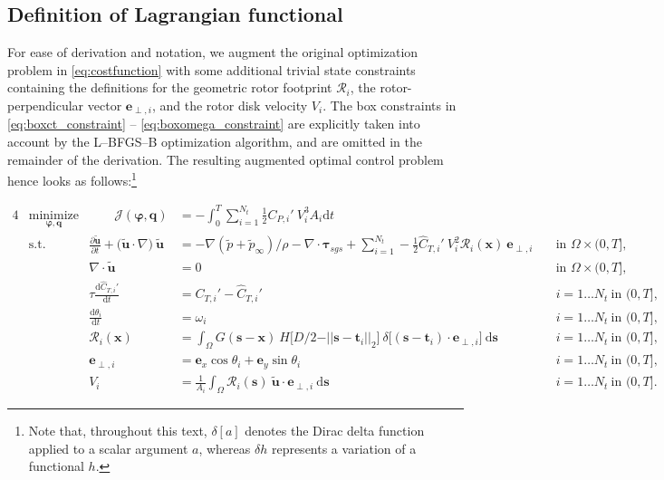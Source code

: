 \documentclass[energies,article,submit,moreauthors,latex,10pt,a4paper]{mdpi}
\newcommand{\ds}{~\text{d}\boldsymbol{s}}
\newcommand{\bs}[1]{\boldsymbol{#1}}
\newcommand{\dt}{\text{d}t}
\newcommand{\ddt}[1]{\frac{\text{d} #1}{\text{d} t}}
\newcommand{\sint}{\int_{\Omega}}
\newcommand{\Tint}{\int_{0}^{T}}
\newcommand{\utilde}{\widetilde{\bs{u}}}
\newcommand{\ptilde}{\widetilde{p}}
\newcommand{\ctihat}{\widehat{C}_{T,i}'}
\newcommand{\cti}{C_{T,i}'}
\newcommand{\R}{\mathscr{R}}
\newcommand{\J}{\mathscr{J}}
\newcommand{\eperpi}{\bs{e}_{\perp,i}}
\newcommand{\vi}{\frac{1}{A_i} \sint \R_i (\bs{s})~\utilde \cdot \eperpi \ds}
\newcommand{\diracdelta}{{\delta}}
\begin{document}
\subsection{Definition of Lagrangian functional}\label{sec:define_lagr}
\noindent For ease of derivation and notation, we augment the original optimization problem in \eqref{eq:costfunction} with some additional trivial state constraints containing the definitions for the geometric rotor footprint $\R_i$, the rotor-perpendicular vector $\eperpi$, and the rotor disk velocity $V_i$. The box constraints in \eqref{eq:boxct_constraint} -- \eqref{eq:boxomega_constraint} are explicitly taken into account by the L--BFGS--B optimization algorithm, and are omitted in the remainder of the derivation. The resulting augmented optimal control problem hence looks as follows:\footnote{Note that, throughout this text, $\delta [ a ]$ denotes the Dirac delta function applied to a scalar argument $a$, whereas $\delta h$ represents a variation of a functional $h$. }

{\small
\begin{alignat}{4}
& \underset{\bs{\varphi}, \bs{q}}{\text{minimize}}  & \qquad  \J(\bs{\varphi}, \bs{q}) &= - \Tint \sum_{i=1}^{N_t} \frac{1}{2} C_{P,i}'~V_i^3 A_i \dt  & \\
& \text{s.t.}                      			&         \frac{\partial \utilde}{\partial t} + \big(\utilde \cdot \nabla \big)~ \utilde &= - \nabla (\ptilde + \ptilde_\infty) / \rho - \nabla \cdot \boldsymbol{\tau}_{sgs} + \sum_{i=1}^{N_t} - \frac{1}{2} \ctihat~V_i^2 \R_i(\bs{x})~\eperpi \quad  & \text{in } \Omega \times (0,T], \\
&                                                   &        \nabla \cdot \utilde&=0 									        & \text{in } \Omega \times (0,T],\\
&                                                   &        \tau \ddt{\ctihat}&=\cti - \ctihat 								& i=1\dots N_t~\text{in } (0,T],\\
&                                                   &        \ddt{\theta_i}&=\omega_i											& i=1\dots N_t~\text{in } (0,T],\\
&                                                   &        \R_i(\bs{x})&= \sint G(\bs{s} - \bs{x})~H\big[D/2 - \vert\vert \bs{s} - \bs{t}_i \vert\vert_2\big]~\diracdelta \big[ (\bs{s} - \bs{t}_i)\cdot \eperpi \big] \ds											& i=1\dots N_t~\text{in } (0,T],\\
&                                                   &        \eperpi&=\bs{e}_x \cos \theta_i  + \bs{e}_y \sin \theta_i											& i=1\dots N_t~\text{in } (0,T],\\
&                                                   &        V_i&= \vi											& i=1\dots N_t~\text{in } (0,T].
\end{alignat}
}
\end{document}
